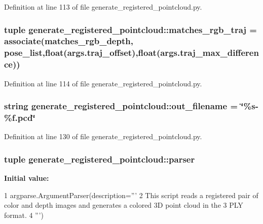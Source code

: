 \-Definition at line 113 of file generate\-\_\-registered\-\_\-pointcloud.\-py.

\subsubsection[{matches\-\_\-rgb\-\_\-traj}]{\setlength{\rightskip}{0pt plus 5cm}tuple {\bf generate\-\_\-registered\-\_\-pointcloud\-::matches\-\_\-rgb\-\_\-traj} = associate({\bf matches\-\_\-rgb\-\_\-depth}, {\bf pose\-\_\-list},float(args.\-traj\-\_\-offset),float(args.\-traj\-\_\-max\-\_\-difference))}\label{namespacegenerate__registered__pointcloud_aba76a03b9da5ee929d669f6a663f3376}


\-Definition at line 114 of file generate\-\_\-registered\-\_\-pointcloud.\-py.

\subsubsection[{out\-\_\-filename}]{\setlength{\rightskip}{0pt plus 5cm}string {\bf generate\-\_\-registered\-\_\-pointcloud\-::out\-\_\-filename} = \char`\"{}\%s-\/\%f.\-pcd\char`\"{}}\label{namespacegenerate__registered__pointcloud_a12ce965078aedde17b7fb0739bd25f47}


\-Definition at line 130 of file generate\-\_\-registered\-\_\-pointcloud.\-py.

\subsubsection[{parser}]{\setlength{\rightskip}{0pt plus 5cm}tuple {\bf generate\-\_\-registered\-\_\-pointcloud\-::parser}}\label{namespacegenerate__registered__pointcloud_a535cf1b5724f99ef6fed43367affd51a}
{\bfseries \-Initial value\-:}
\begin{DoxyCode}
1 argparse.ArgumentParser(description='''
2     This script reads a registered pair of color and depth images and generates
       a colored 3D point cloud in the
3     PLY format. 
4     ''')
\end{DoxyCode}



